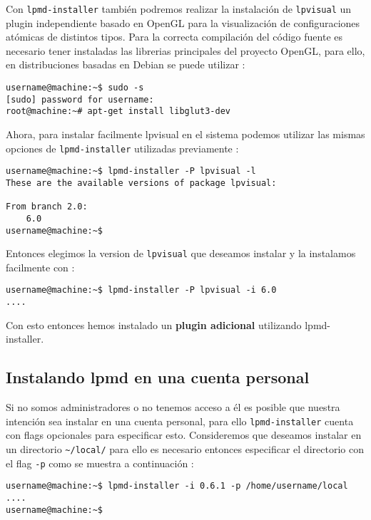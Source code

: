 Con \verb|lpmd-installer| tambi\'en podremos realizar la instalaci\'on de \verb|lpvisual| un plugin independiente basado en OpenGL para la visualizaci\'on de configuraciones at\'omicas de distintos tipos. Para la correcta compilaci\'on del c\'odigo fuente es necesario tener instaladas las librerias principales del proyecto OpenGL, para ello, en distribuciones basadas en Debian se puede utilizar :

\begin{verbatim}
username@machine:~$ sudo -s
[sudo] password for username: 
root@machine:~# apt-get install libglut3-dev
\end{verbatim}

Ahora, para instalar facilmente lpvisual en el sistema podemos utilizar las mismas opciones de \verb|lpmd-installer| utilizadas previamente :

\begin{verbatim}
username@machine:~$ lpmd-installer -P lpvisual -l
These are the available versions of package lpvisual:

From branch 2.0: 
    6.0
username@machine:~$  
\end{verbatim}

Entonces elegimos la version de \verb|lpvisual| que deseamos instalar y la instalamos facilmente con :

\begin{verbatim}
username@machine:~$ lpmd-installer -P lpvisual -i 6.0
....
\end{verbatim}

Con esto entonces hemos instalado un \textbf{plugin adicional} utilizando lpmd-installer.

\subsection{Instalando lpmd en una cuenta personal}

Si no somos administradores o no tenemos acceso a \'el es posible que nuestra intenci\'on sea instalar {\lpmd} en una cuenta personal, para ello \verb|lpmd-installer| cuenta con flags opcionales para especificar  esto. Consideremos que deseamos instalar {\lpmd} en un directorio \verb|~/local/| para ello es necesario entonces especificar el directorio con el flag \verb|-p| como se muestra a continuaci\'on :

\begin{verbatim}
username@machine:~$ lpmd-installer -i 0.6.1 -p /home/username/local
....
username@machine:~$
\end{verbatim}

